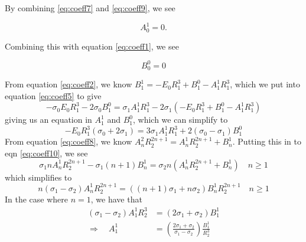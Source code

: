By combining \ref{eq:coeff7} and \ref{eq:coeff9}, we see
\begin{mdframed}[backgroundcolor=gray!10, innertopmargin=0pt, innerbottommargin=10pt]
\begin{equation}
    A_0^1 = 0.
    \label{eq:coeff11}
\end{equation}
\end{mdframed}
Combining this with equation \ref{eq:coeff1}, we see
\begin{mdframed}[backgroundcolor=gray!10, innertopmargin=0pt, innerbottommargin=10pt]
\begin{equation}
    B_0^0 = 0
    \label{eq:coeff12}
\end{equation}
\end{mdframed}
From equation \ref{eq:coeff2}, we know $B_1^1 = -E_0R_1^3 + B_1^0 - A_1^1R_1^3$, which we put into equation \ref{eq:coeff5} to give
\begin{displaymath}
    - \sigma_0 E_0 R_1^{3}
    - 2 \sigma_0 B_1^0
    = \sigma_1 A_1^1 R_1^{3}
    - 2 \sigma_1 (-E_0R_1^3 + B_1^0 - A_1^1R_1^3)
\end{displaymath}
giving us an equation in $A_1^1$ and $B_1^0$, which we can simplify to
\begin{equation}
    - E_0 R_1^{3} (\sigma_0 + 2\sigma_1)
    = 3\sigma_1 A_1^1 R_1^{3}
    + 2 (\sigma_0-\sigma_1)B_1^0
    \label{eq:coeff13}
\end{equation}
From equation \ref{eq:coeff8}, we know $ A_n^2 R_2^{2n+1}= A_n^1R_2^{2n+1} + B_n^1.$ Putting this in to eqn \ref{eq:coeff10}, we see
\begin{displaymath}
    \sigma_1 n A_n^1 R_2^{2n+1}
    - \sigma_1 (n+1)B_n^1
    =
    \sigma_2 n (A_n^1R_2^{2n+1} + B_n^1) \quad n \geq 1
\end{displaymath}
which simplifies to
\begin{equation}
    n(\sigma_1 - \sigma_2)  A_n^1 R_2^{2n+1}
    =
    ((n+1)\sigma_1  + n\sigma_2 ) B_n^1 R_2^{2n+1} \quad n \geq 1
    \label{eq:coeff14}
\end{equation}
In the case where $n=1$, we have that
\begin{equation}
    \begin{split}
        (\sigma_1 - \sigma_2) A_1^1 R_2^{3}
        &=
        (2\sigma_1 + \sigma_2) B_1^1 \\
        \Rightarrow \quad
         A_1^1
        &=
        \left(\frac{2\sigma_1 + \sigma_2}{\sigma_1 - \sigma_2}\right) \frac{B_1^1}{R_2^{3}}
    \end{split}
    \label{eq:starstar}
\end{equation}
